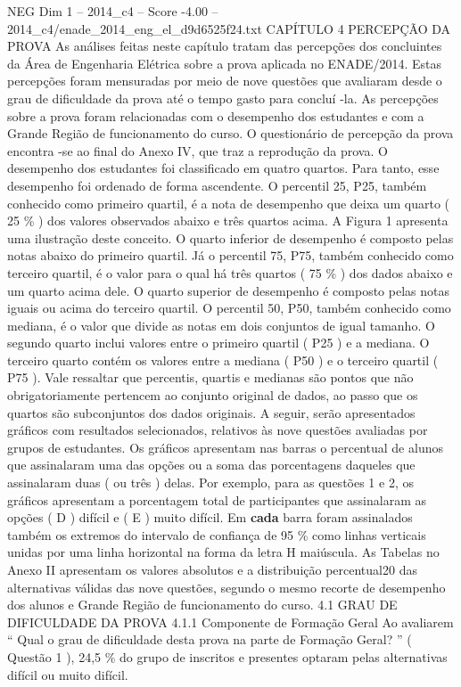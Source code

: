 \begin{textsample}{NEG Dim 1 – 2014\_c4 – Score -4.00 – 2014\_c4/enade\_2014\_eng\_el\_d9d6525f24.txt}  \label{ex:f1_neg_126}
CAPÍTULO 4 PERCEPÇÃO DA PROVA As análises feitas neste capítulo tratam das percepções dos concluintes da Área de Engenharia Elétrica sobre a prova aplicada no ENADE/2014.
Estas percepções foram mensuradas por meio de nove questões que avaliaram desde o grau de dificuldade da prova até o tempo gasto para concluí -la.
As percepções sobre a prova foram relacionadas com o desempenho dos estudantes e com a Grande Região de funcionamento do curso.
O questionário de percepção da prova encontra -se ao final do Anexo IV, que traz a reprodução da prova.
O desempenho dos estudantes foi classificado em quatro quartos.
Para tanto, esse desempenho foi ordenado de forma ascendente.
O percentil 25, P25, também conhecido como primeiro quartil, é a nota de desempenho que deixa um quarto ( 25 \% ) dos valores observados abaixo e três quartos acima.
A Figura 1 apresenta uma ilustração deste conceito.
O quarto inferior de desempenho é composto pelas notas abaixo do primeiro quartil.
Já o percentil 75, P75, também conhecido como terceiro quartil, é o valor para o qual há três quartos ( 75 \% ) dos dados abaixo e um quarto acima dele.
O quarto superior de desempenho é composto pelas notas iguais ou acima do terceiro quartil.
O percentil 50, P50, também conhecido como mediana, é o valor que divide as notas em dois conjuntos de igual tamanho.
O segundo quarto inclui valores entre o primeiro quartil ( P25 ) e a mediana.
O terceiro quarto contém os valores entre a mediana ( P50 ) e o terceiro quartil ( P75 ).
Vale ressaltar que percentis, quartis e medianas são pontos que não obrigatoriamente pertencem ao conjunto original de dados, ao passo que os quartos são subconjuntos dos dados originais.
A seguir, serão apresentados gráficos com resultados selecionados, relativos às nove questões avaliadas por grupos de estudantes.
Os gráficos apresentam nas barras o percentual de alunos que assinalaram uma das opções ou a soma das porcentagens daqueles que assinalaram duas ( ou três ) delas.
Por exemplo, para as questões 1 e 2, os gráficos apresentam a porcentagem total de participantes que assinalaram as opções ( D ) difícil e ( E ) muito difícil.
Em \textbf{cada} barra foram assinalados também os extremos do intervalo de confiança de 95 \% como linhas verticais unidas por uma linha horizontal na forma da letra H maiúscula.
As Tabelas no Anexo II apresentam os valores absolutos e a distribuição percentual20 das alternativas válidas das nove questões, segundo o mesmo recorte de desempenho dos alunos e Grande Região de funcionamento do curso. 4.1 GRAU DE DIFICULDADE DA PROVA 4.1.1 Componente de Formação Geral Ao avaliarem “ Qual o grau de dificuldade desta prova na parte de Formação Geral? ” ( Questão 1 ), 24,5 \% do grupo de inscritos e presentes optaram pelas alternativas difícil ou muito difícil.

\end{textsample}
